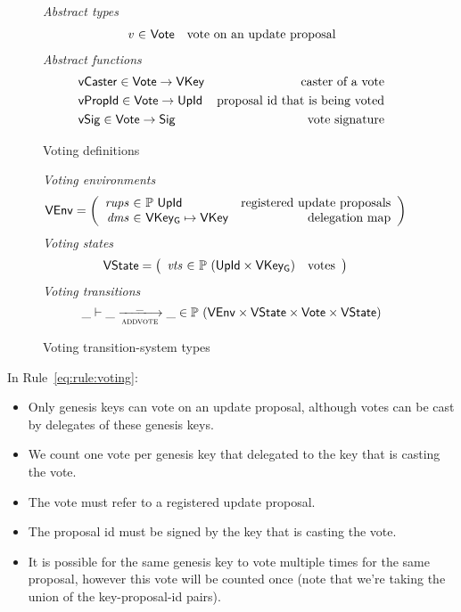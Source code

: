 \begin{figure}[htb]
  \emph{Abstract types}
  \begin{equation*}
    \begin{array}{r@{~\in~}lr}
      \var{v} & \Vote & \text{vote on an update proposal}
    \end{array}
  \end{equation*}
  \emph{Abstract functions}
  \begin{align*}
    & \mathsf{vCaster} \in \mathsf{Vote} \to \mathsf{VKey} & \text{caster of a vote}\\
    & \mathsf{vPropId} \in \mathsf{Vote} \to \mathsf{UpId} & \text{proposal id that is being voted}\\
    & \mathsf{vSig} \in \mathsf{Vote} \to \mathsf{Sig} & \text{vote signature}
  \end{align*}
  \caption{Voting definitions}
  \label{fig:defs:voting}
\end{figure}

\begin{figure}[htb]
  \emph{Voting environments}
  \begin{align*}
    & \VEnv
      = \left(
      \begin{array}{r@{~\in~}lr}
        \var{rups} & \powerset{\UPropId}
        & \text{registered update proposals}\\
        \var{dms} & \VKeyGen \mapsto \VKey & \text{delegation map}
      \end{array}\right)
  \end{align*}
  \emph{Voting states}
  \begin{align*}
    & \VState
      = \left(
      \begin{array}{r@{~\in~}lr}
        \var{vts} & \powerset{(\UPropId \times \VKeyGen)} & \text{votes}
      \end{array}\right)
  \end{align*}
  \emph{Voting transitions}
    \begin{equation*}
    \_ \vdash \_ \trans{addvote}{\_} \_ \in
    \powerset (\VEnv \times \VState \times \Vote \times \VState)
    \end{equation*}
  \caption{Voting transition-system types}
  \label{fig:ts-types:voting}
\end{figure}

In Rule~\ref{eq:rule:voting}:
\begin{itemize}
\item Only genesis keys can vote on an update proposal, although votes can be
  cast by delegates of these genesis keys.
\item We count one vote per genesis key that delegated to the key that is
  casting the vote.
\item The vote must refer to a registered update proposal.
\item The proposal id must be signed by the key that is casting the vote.
\item It is possible for the same genesis key to vote multiple times for
  the same proposal, however this vote will be counted once (note that we're
  taking the union of the key-proposal-id pairs).
\end{itemize}

